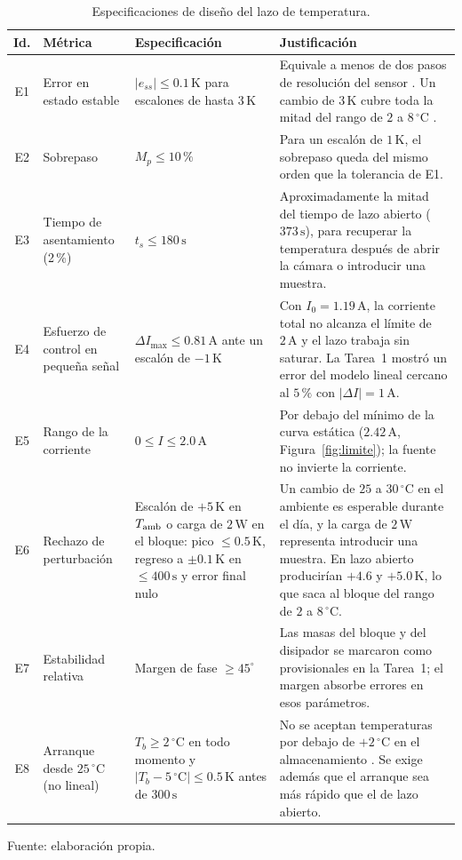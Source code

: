 \documentclass[journal,twocolumn]{IEEEtran}
\newcommand{\tableformat}{\footnotesize\setlength{\tabcolsep}{3pt}\renewcommand{\arraystretch}{1.15}}
\begin{document}
\begin{table}[!tbp]\centering
\caption{Especificaciones de diseño del lazo de temperatura.}\label{tab:especificaciones}
{\tableformat
\begin{tabularx}{\textwidth}{c>{\raggedright\arraybackslash}p{3.4cm}>{\raggedright\arraybackslash}p{5.2cm}L}\toprule
Id. & Métrica & Especificación & Justificación\\\midrule
E1 & Error en estado estable & $|e_{ss}|\le0.1\,\mathrm K$ para escalones de hasta $3\,\mathrm K$ & Equivale a menos de dos pasos de resolución del sensor \cite{ds18b20}. Un cambio de $3\,\mathrm K$ cubre toda la mitad del rango de $2$ a $8\,^\circ\mathrm C$ \cite{who_pqs}.\\
E2 & Sobrepaso & $M_p\le10\,\%$ & Para un escalón de $1\,\mathrm K$, el sobrepaso queda del mismo orden que la tolerancia de E1.\\
E3 & Tiempo de asentamiento (2\,\%) & $t_s\le180\,\mathrm s$ & Aproximadamente la mitad del tiempo de lazo abierto ($373\,\mathrm s$), para recuperar la temperatura después de abrir la cámara o introducir una muestra.\\
E4 & Esfuerzo de control en pequeña señal & $\Delta I_{\max}\le0.81\,\mathrm A$ ante un escalón de $-1\,\mathrm K$ & Con $I_0=1.19\,\mathrm A$, la corriente total no alcanza el límite de $2\,\mathrm A$ y el lazo trabaja sin saturar. La Tarea~1 mostró un error del modelo lineal cercano al $5\,\%$ con $|\Delta I|=1\,\mathrm A$.\\
E5 & Rango de la corriente & $0\le I\le2.0\,\mathrm A$ & Por debajo del mínimo de la curva estática ($2.42\,\mathrm A$, Figura~\ref{fig:limite}); la fuente no invierte la corriente.\\
E6 & Rechazo de perturbación & Escalón de $+5\,\mathrm K$ en $T_{\rm amb}$ o carga de $2\,\mathrm W$ en el bloque: pico $\le0.5\,\mathrm K$, regreso a $\pm0.1\,\mathrm K$ en $\le400\,\mathrm s$ y error final nulo & Un cambio de $25$ a $30\,^\circ\mathrm C$ en el ambiente es esperable durante el día, y la carga de $2\,\mathrm W$ representa introducir una muestra. En lazo abierto producirían $+4.6$ y $+5.0\,\mathrm K$, lo que saca al bloque del rango de $2$ a $8\,^\circ\mathrm C$.\\
E7 & Estabilidad relativa & Margen de fase $\ge45^\circ$ & Las masas del bloque y del disipador se marcaron como provisionales en la Tarea~1; el margen absorbe errores en esos parámetros.\\
E8 & Arranque desde $25\,^\circ\mathrm C$ (no lineal) & $T_b\ge2\,^\circ\mathrm C$ en todo momento y $|T_b-5\,^\circ\mathrm C|\le0.5\,\mathrm K$ antes de $300\,\mathrm s$ & No se aceptan temperaturas por debajo de $+2\,^\circ\mathrm C$ en el almacenamiento \cite{who_pqs}. Se exige además que el arranque sea más rápido que el de lazo abierto.\\\bottomrule
\end{tabularx}}
\par\smallskip\footnotesize Fuente: elaboración propia.
\end{table}
\end{document}
